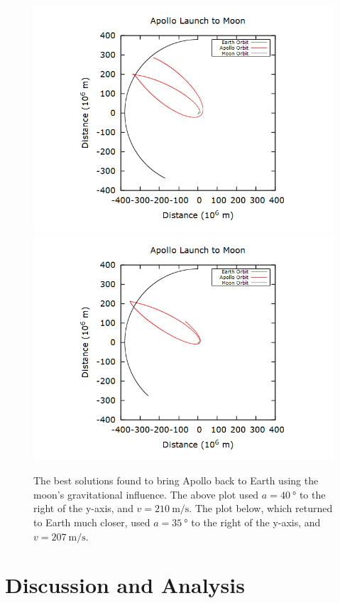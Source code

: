 \documentclass[aps,prl,twocolumn,superscriptaddress]{revtex4-1}
\begin{document}
\begin{figure}[htbp]
  	\begin{center}
 		\includegraphics[scale=0.3]{back.png}
 		\includegraphics[scale=0.3]{back2.png}
  		\caption{The best solutions found to bring Apollo back to Earth using the moon's gravitational influence. The above plot used $a = \SI{40}{\degree}$ to the right of the y-axis, and $v = \SI{210}{\m\per\s}$. The plot below, which returned to Earth much closer, used $a = \SI{35}{\degree}$ to the right of the y-axis, and $v = \SI{207}{\m\per\s}$.}
  		\label{gr:back}
 	\end{center}
\end{figure}

\section{Discussion and Analysis}
\end{document}
